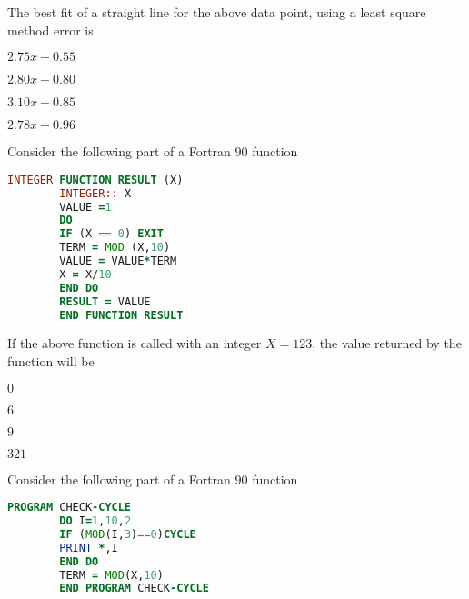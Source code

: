 		The best fit of a straight line for the above data point, using a least square method error is
		\begin{enumerate}
		\end{enumerate}
	\item Consider the following part of a Fortran $90$ function\\
		\begin{lstlisting}[language=Fortran]
		INTEGER FUNCTION RESULT (X) 
		INTEGER:: X 
		VALUE =1 
		DO 
		IF (X == 0) EXIT 
		TERM = MOD (X,10) 
		VALUE = VALUE*TERM 
		X = X/10 
		END DO 
		RESULT = VALUE 
		END FUNCTION RESULT
		\end{lstlisting}

		If the above function is called with an integer $X=123$, the value returned by the function will be
		\begin{enumerate}
				\begin{multicols}{2}
				\item $0$
					\columnbreak
				\item $6$
				\end{multicols}
				\begin{multicols}{2}
				\item $9$
					\columnbreak
				\item $321$
				\end{multicols}
		\end{enumerate}
	\item Consider the following part of a Fortran $90$ function\\
		\begin{lstlisting}[language=Fortran]
		PROGRAM CHECK-CYCLE
		DO I=1,10,2
		IF (MOD(I,3)==0)CYCLE
		PRINT *,I
		END DO
		TERM = MOD(X,10)
		END PROGRAM CHECK-CYCLE
		\end{lstlisting}

